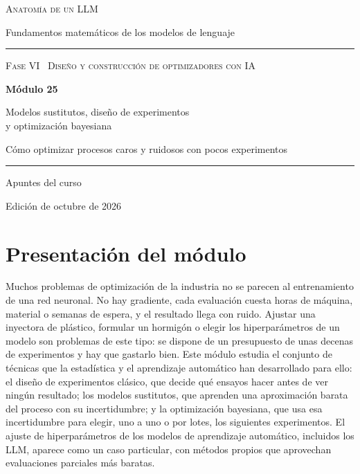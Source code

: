 \documentclass[11pt,a4paper,twoside,openany]{book}
\begin{document}
\frontmatter
\begin{titlepage}
\centering
\vspace*{2.5cm}
{\large\scshape Anatomía de un LLM}\par
\vspace{0.4cm}
{\normalsize Fundamentos matemáticos de los modelos de lenguaje}\par
\vspace{2.2cm}
\rule{\textwidth}{0.8pt}\par\vspace{0.5cm}
{\small\scshape Fase VI \textperiodcentered\ Diseño y construcción de optimizadores con IA}\par\vspace{0.3cm}
{\Huge\bfseries Módulo 25\par}\vspace{0.3cm}
{\LARGE Modelos sustitutos, diseño de experimentos\\[2pt] y optimización bayesiana\par}
\vspace{0.2cm}
{\large Cómo optimizar procesos caros y ruidosos con pocos experimentos\par}
\vspace{0.5cm}\rule{\textwidth}{0.4pt}\par
\vspace{1.6cm}
{\large Apuntes del curso}\par
\vfill
{\small Edición de octubre de 2026}\par
\end{titlepage}

\chapter*{Presentación del módulo}

Muchos problemas de optimización de la industria no se parecen al entrenamiento de una red neuronal. No hay gradiente, cada evaluación cuesta horas de máquina, material o semanas de espera, y el resultado llega con ruido. Ajustar una inyectora de plástico, formular un hormigón o elegir los hiperparámetros de un modelo son problemas de este tipo: se dispone de un presupuesto de unas decenas de experimentos y hay que gastarlo bien. Este módulo estudia el conjunto de técnicas que la estadística y el aprendizaje automático han desarrollado para ello: el diseño de experimentos clásico, que decide qué ensayos hacer antes de ver ningún resultado; los modelos sustitutos, que aprenden una aproximación barata del proceso con su incertidumbre; y la optimización bayesiana, que usa esa incertidumbre para elegir, uno a uno o por lotes, los siguientes experimentos. El ajuste de hiperparámetros de los modelos de aprendizaje automático, incluidos los LLM, aparece como un caso particular, con métodos propios que aprovechan evaluaciones parciales más baratas.
\end{document}
